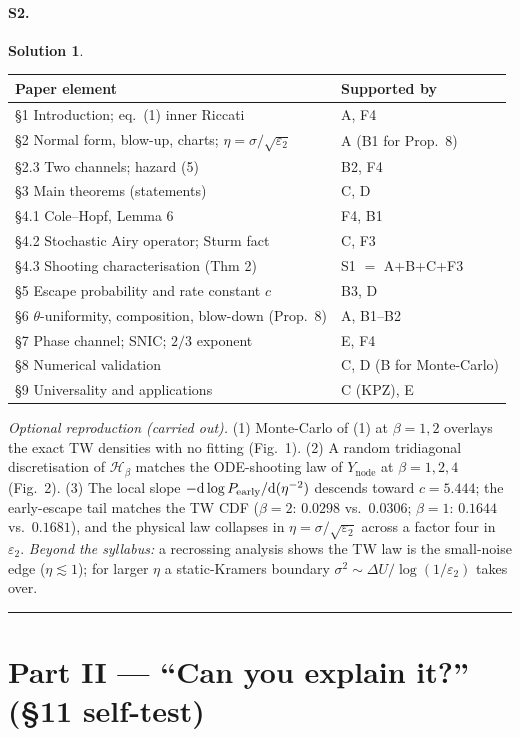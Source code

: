 \documentclass[11pt]{article}
\newcommand{\ep}{\varepsilon_2}
\newcommand{\dd}{\mathrm{d}}
\newcommand{\Ynode}{Y_{\mathrm{node}}}
\theoremstyle{definition}
\newtheorem*{sol}{Solution}
\begin{document}
\paragraph{S2.}
\begin{sol}
\begin{center}
\begin{tabular}{ll}
\hline
Paper element & Supported by\\
\hline
\S1 Introduction; eq.~(1) inner Riccati & A, F4\\
\S2 Normal form, blow-up, charts; $\eta=\sigma/\sqrt{\ep}$ & A (B1 for Prop.~8)\\
\S2.3 Two channels; hazard (5) & B2, F4\\
\S3 Main theorems (statements) & C, D\\
\S4.1 Cole--Hopf, Lemma 6 & F4, B1\\
\S4.2 Stochastic Airy operator; Sturm fact & C, F3\\
\S4.3 Shooting characterisation (Thm 2) & S1 $=$ A+B+C+F3\\
\S5 Escape probability and rate constant $c$ & B3, D\\
\S6 $\theta$-uniformity, composition, blow-down (Prop.~8) & A, B1--B2\\
\S7 Phase channel; SNIC; $2/3$ exponent & E, F4\\
\S8 Numerical validation & C, D (B for Monte-Carlo)\\
\S9 Universality and applications & C (KPZ), E\\
\hline
\end{tabular}
\end{center}
\emph{Optional reproduction (carried out).} (1) Monte-Carlo of (1) at $\beta=1,2$ overlays the exact
TW densities with no fitting (Fig.~1). (2) A random tridiagonal discretisation of
$\mathcal H_\beta$ matches the ODE-shooting law of $\Ynode$ at $\beta=1,2,4$ (Fig.~2). (3) The
local slope $-\dd\log P_{\rm early}/\dd(\eta^{-2})$ descends toward $c=5.444$; the early-escape
tail matches the TW CDF ($\beta=2$: $0.0298$ vs.\ $0.0306$; $\beta=1$: $0.1644$ vs.\ $0.1681$),
and the physical law collapses in $\eta=\sigma/\sqrt{\ep}$ across a factor four in $\ep$.
\emph{Beyond the syllabus:} a recrossing analysis shows the TW law is the small-noise edge
($\eta\lesssim1$); for larger $\eta$ a static-Kramers boundary $\sigma^2\sim\Delta U/\log(1/\ep)$
takes over.
\end{sol}

\bigskip
\hrule
\section*{Part II --- ``Can you explain it?'' (\S11 self-test)}
\end{document}
